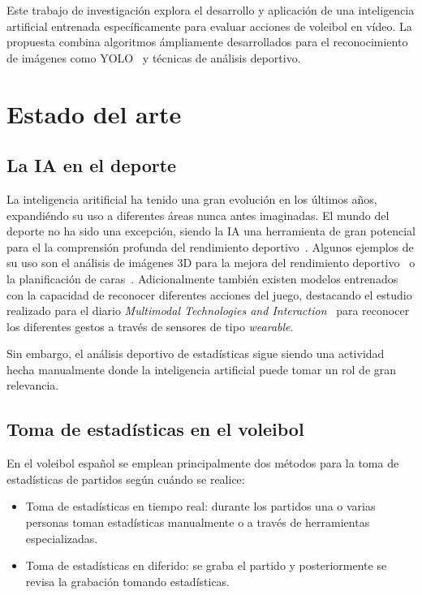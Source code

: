 \documentclass[12pt]{report} %
\begin{document}
    Este trabajo de investigación explora el desarrollo y aplicación de una
    inteligencia artificial entrenada específicamente para evaluar acciones de
    voleibol en vídeo. La propuesta combina algoritmos ámpliamente
    desarrollados para el reconocimiento de imágenes como YOLO~\cite{YOLO} y
    técnicas de análisis deportivo.

 

    \chapter{Estado del arte}
    \label{chap:estadoarte}
    \section{La IA en el deporte}
    La inteligencia aritificial ha tenido una gran evolución en los últimos
    años, expandiéndo su uso a diferentes áreas nunca antes imaginadas. El
    mundo del deporte no ha sido una excepción, siendo la IA una herramienta de
    gran potencial para el la comprensión profunda del rendimiento
    deportivo~\cite{ia-sport}. Algunos ejemplos de su uso son el análisis de
    imágenes 3D para la mejora del rendimiento deportivo~\cite{analysis3d} o la
    planificación de caras~\cite{wl}. Adicionalmente también existen modelos
    entrenados con la capacidad de reconocer diferentes acciones del juego,
    destacando el estudio realizado para el diario \textit{Multimodal
    Technologies and Interaction}~\cite{wearable} para reconocer los diferentes
    gestos a través de sensores de tipo \textit{wearable}.

    Sin embargo, el análisis deportivo de estadísticas sigue siendo una
    actividad hecha manualmente donde la inteligencia artificial puede tomar un
    rol de gran relevancia.


    \section{Toma de estadísticas en el voleibol}
    En el voleibol español se emplean principalmente dos
    métodos para la toma de estadísticas de partidos según cuándo se realice:
    \begin{itemize}
        \item Toma de estadísticas en tiempo real: durante los partidos una o
        varias personas toman estadísticas manualmente o a través de
        herramientas especializadas.
        \item Toma de estadísticas en diferido: se graba el partido y
        posteriormente se revisa la grabación tomando estadísticas.
    \end{itemize}
\end{document}
